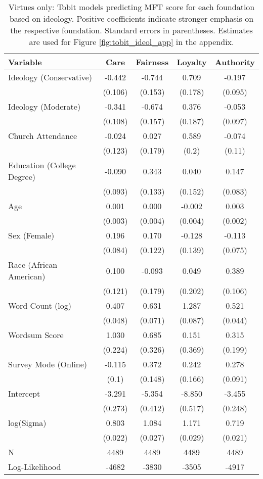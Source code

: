 \begin{table}[ht]
\centering
\caption{Virtues only: Tobit models predicting MFT score for each foundation based 
           on ideology. Positive coefficients indicate stronger emphasis on the respective 
           foundation. Standard errors in parentheses. Estimates are used for 
           Figure \ref{fig:tobit_ideol_app} in the appendix.} 
\label{tab:tobit_virtue}
\begingroup\footnotesize
\begin{tabular}{lcccc}
  \hline
Variable & Care & Fairness & Loyalty & Authority \\ 
  \hline
Ideology (Conservative) & -0.442 & -0.744 &  0.709 & -0.197 \\ 
   & (0.106) & (0.153) & (0.178) & (0.095) \\ 
  Ideology (Moderate) & -0.341 & -0.674 &  0.376 & -0.053 \\ 
   & (0.108) & (0.157) & (0.187) & (0.097) \\ 
  Church Attendance & -0.024 &  0.027 &  0.589 & -0.074 \\ 
   & (0.123) & (0.179) & (0.2) & (0.11) \\ 
  Education (College Degree) & -0.090 &  0.343 &  0.040 &  0.147 \\ 
   & (0.093) & (0.133) & (0.152) & (0.083) \\ 
  Age &  0.001 &  0.000 & -0.002 &  0.003 \\ 
   & (0.003) & (0.004) & (0.004) & (0.002) \\ 
  Sex (Female) &  0.196 &  0.170 & -0.128 & -0.113 \\ 
   & (0.084) & (0.122) & (0.139) & (0.075) \\ 
  Race (African American) &  0.100 & -0.093 &  0.049 &  0.389 \\ 
   & (0.121) & (0.179) & (0.202) & (0.106) \\ 
  Word Count (log) &  0.407 &  0.631 &  1.287 &  0.521 \\ 
   & (0.048) & (0.071) & (0.087) & (0.044) \\ 
  Wordsum Score &  1.030 &  0.685 &  0.151 &  0.315 \\ 
   & (0.224) & (0.326) & (0.369) & (0.199) \\ 
  Survey Mode (Online) & -0.115 &  0.372 &  0.242 &  0.278 \\ 
   & (0.1) & (0.148) & (0.166) & (0.091) \\ 
  Intercept & -3.291 & -5.354 & -8.850 & -3.455 \\ 
   & (0.273) & (0.412) & (0.517) & (0.248) \\ 
  log(Sigma) &  0.803 &  1.084 &  1.171 &  0.719 \\ 
   & (0.022) & (0.027) & (0.029) & (0.021) \\ 
   \hline
N & 4489 & 4489 & 4489 & 4489 \\ 
  Log-Likelihood & -4682 & -3830 & -3505 & -4917 \\ 
   \hline
\end{tabular}
\endgroup
\end{table}
